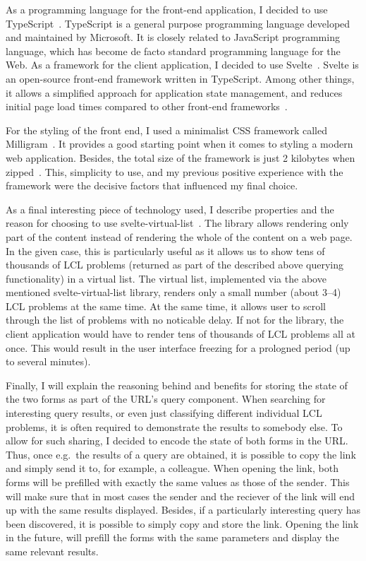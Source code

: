 As a programming language for the front-end application, I decided
to use TypeScript~\cite{TypeScript}. TypeScript is a general purpose
programming language developed and maintained by Microsoft. It is closely related to JavaScript programming language, which has become de facto standard programming language for the Web.
As a framework for the client application, I decided to use
Svelte~\cite{Svelte}. Svelte is an open-source front-end framework
written in TypeScript. Among other things, it allows a simplified
approach for application state management, and reduces initial
page load times compared to other front-end frameworks~\cite{SvelteVsReactBundleSize}.

For the styling of the front end, I used a minimalist CSS framework
called Milligram~\cite{Milligram}. It provides a good starting point
when it comes to styling a modern web application. Besides, the total
size of the framework is just 2 kilobytes when zipped~\cite{Milligram}.
This, simplicity to use, and my previous positive experience with
the framework were the decisive factors that influenced my final
choice.

As a final interesting piece of technology used, I describe properties
and the reason for choosing to use svelte-virtual-list~\cite{svelte-virtual-list}.
The library allows rendering only part of the content instead of rendering
the whole of the content on a web page. In the given case, this is
particularly useful as it allows us to
show tens of thousands of LCL problems (returned as part of the described above querying functionality) in a virtual list.
The virtual list, implemented via the above mentioned svelte-virtual-list library, renders only a small number (about 3--4)
LCL problems at the same time. At the same time, it allows user to
scroll through the list of problems with no noticable delay.
If not for the library, the client application would have to render
tens of thousands of LCL problems all at once. This would result in
the user interface freezing for a prologned period (up to several minutes).

Finally, I will explain the reasoning behind and benefits for
storing the state of the two forms as part of the URL's query
component. When searching for interesting query results, or even
just classifying different individual LCL problems, it is often
required to demonstrate the results to somebody else. To allow for such
sharing, I decided to encode the state of both forms in the URL.
Thus, once e.g.\ the results of a query are obtained, it is possible
to copy the link and simply send it to, for example, a colleague.
When opening the link, both forms will be prefilled with
exactly the same values as those of the sender. This will make sure
that in most cases the sender and the reciever of the link will end
up with the same results displayed. Besides, if a particularly
interesting query has been discovered, it is possible to
simply copy and store the link. Opening the link in the future,
will prefill the forms with the same parameters and display
the same relevant results.


